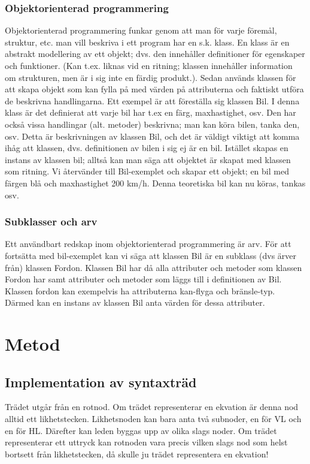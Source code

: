 \documentclass[12pt,a4paper]{article}
\begin{document}
\subsubsection{Objektorienterad programmering}
\label{subsubsection:oop}
Objektorienterad programmering funkar genom att man för varje föremål, struktur, etc. man vill beskriva i ett program har en s.k. klass. En klass är en abstrakt modellering av ett objekt; dvs. den innehåller definitioner för egenskaper och funktioner. (Kan t.ex. liknas vid en ritning; klassen innehåller information om strukturen, men är i sig inte en färdig produkt.). Sedan används klassen för att skapa objekt som kan fylla på med värden på attributerna och faktiskt utföra de beskrivna handlingarna. Ett exempel är att föreställa sig klassen Bil. I denna klass är det definierat att varje bil har t.ex en färg, maxhastighet, osv. Den har också vissa handlingar (alt. metoder) beskrivna; man kan köra bilen, tanka den, osv. Detta är beskrivningen av klassen Bil, och det är väldigt viktigt att komma ihåg att klassen, dvs. definitionen av bilen i sig ej är en bil. Istället skapas en instans av klassen bil; alltså kan man säga att objektet är skapat med klassen som ritning. Vi återvänder till Bil-exemplet och skapar ett objekt; en bil med färgen blå och maxhastighet 200 km/h. Denna teoretiska bil kan nu köras, tankas osv.
\subsubsection{Subklasser och arv}
Ett användbart redskap inom objektorienterad programmering är arv. För att fortsätta med bil-exemplet kan vi säga att klassen Bil är en subklass (dvs ärver från) klassen Fordon. Klassen Bil har då alla attributer och metoder som klassen Fordon har samt attributer och metoder som läggs till i definitionen av Bil. Klassen fordon kan exempelvis ha attributerna kan-flyga och bränsle-typ. Därmed kan en instans av klassen Bil anta värden för dessa attributer.
\section{Metod}                                                                
\subsection{Implementation av syntaxträd}
Trädet utgår från en rotnod. Om trädet representerar en ekvation är denna nod alltid ett likhetstecken. Likhetsnoden kan bara anta två subnoder, en för VL och en för HL. Därefter kan leden byggas upp av olika slags noder. Om trädet representerar ett uttryck kan rotnoden vara precis vilken slags nod som helst bortsett från likhetstecken, då skulle ju trädet representera en ekvation!
\end{document}
